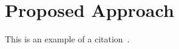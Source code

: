 \chapter{Proposed Approach}
\label{chap:approach}

This is an example of a citation~\cite{Turing90}.